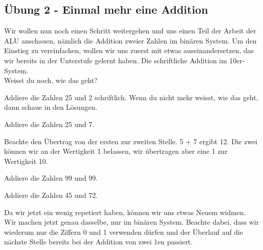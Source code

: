 \subsection{Übung 2 - Einmal mehr eine Addition}
Wir wollen nun noch einen Schritt weitergehen  und uns einen Teil der Arbeit der \gls{ALU} anschauen,
nämlich die Addition zweier Zahlen im binären System. Um den Einstieg zu vereinfachen, wollen wir uns zuerst mit
etwas auseinandersetzen, das wir bereits in der Unterstufe gelernt haben. Die schriftliche Addition im 10er-System.\\
Weisst du noch, wie das geht?\\
\begin{exerciseseries}[columns=1,solsubrule=\hrule]{}
    \begin{exercise}
        Addiere die Zahlen 25 und 2 schriftlich. Wenn du nicht mehr weisst, wie das geht, dann schaue in den Lösungen.
        \vspace{5cm}
    \end{exercise}
    \begin{solution}
    \end{solution}
    \begin{exercise}
        Addiere die Zahlen 25 und 7.
        \vspace{5cm}
    \end{exercise}
    \begin{solution}
        Beachte den Übertrag von der ersten zur zweiten Stelle. 5 + 7 ergibt 12. Die zwei können wir
        an der Wertigkeit 1 belassen, wir übertragen aber eine 1 zur Wertigkeit 10.\\
    \end{solution}
    \begin{exercise}
        Addiere die Zahlen 99 und 99.
        \vspace{5cm}
    \end{exercise}
    \begin{solution}
    \end{solution}
    \begin{exercise}
        Addiere die Zahlen 45 und 72.
        \vspace{5cm}
    \end{exercise}
    \begin{solution}
    \end{solution}
\end{exerciseseries}
\newpage
Da wir jetzt ein wenig repetiert haben, können wir uns etwas Neuem widmen. Wir machen jetzt genau dasselbe, nur
im binären System. Beachte dabei, dass wir wiederum nur die Ziffern 0 und 1 verwenden dürfen
und der Überlauf auf die nächste Stelle bereits bei der Addition von zwei 1en passiert.

